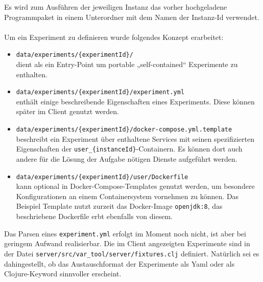 Es wird zum Ausführen der jeweiligen Instanz das vorher hochgeladene Programmpaket in einem Unterordner mit dem Namen der Instanz-Id verwendet. 
\\\\
Um ein Experiment zu definieren wurde folgendes Konzept erarbeitet:
\begin{itemize}
  \item \texttt{data/experiments/\{experimentId\}/} \\dient als ein Entry-Point um portable „self-contained“ Experimente zu enthalten.
  \item \texttt{data/experiments/\{experimentId\}/experiment.yml} \\enthält einige beschreibende Eigenschaften eines Experiments.
    Diese können später im Client genutzt werden.
  \item \texttt{data/experiments/\{experimentId\}/docker-compose.yml.template} \\beschreibt ein Experiment über enthaltene Services mit seinen spezifizierten Eigenschaften der \texttt{user\_\{instanceId\}}-Containern.
    Es können dort auch andere für die Lösung der Aufgabe nötigen Dienste aufgeführt werden.
  \item \texttt{data/experiments/\{experimentId\}/user/Dockerfile} \\kann optional in Docker-Compose-Templates genutzt werden, um besondere Konfigurationen an einem Containersystem vornehmen zu können.
    Das Beispiel Template nutzt zurzeit das Docker-Image \texttt{openjdk:8}, das beschriebene Dockerfile erbt ebenfalls von diesem.
  \end{itemize}
  Das Parsen eines \texttt{experiment.yml} erfolgt im Moment noch nicht, ist aber bei geringem Aufwand realisierbar.
  Die im Client angezeigten Experimente sind in der Datei \texttt{server/src/var\_tool/server/fixtures.clj} definiert.
  Natürlich sei es dahingestellt, ob das Austauschformat der Experimente als Yaml oder als Clojure-Keyword sinnvoller erscheint.

